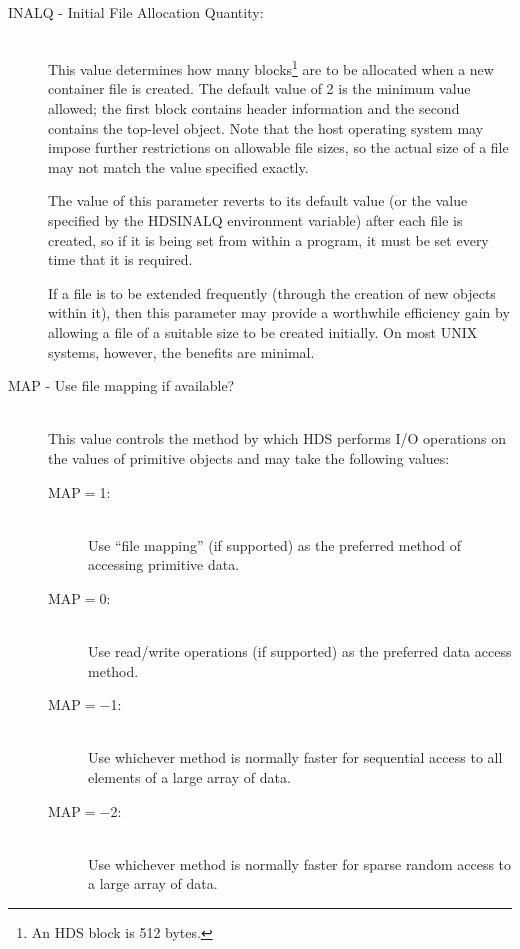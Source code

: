 \documentclass[twoside,11pt]{article}
\newcommand{\xlabel}[1]{}
\renewcommand{\_}{\texttt{\symbol{95}}}
\newcommand{\qt}[1]{``#1''}
\newcommand{\qt}[1]{{\tt{"}}#1{\tt{"}}}
\begin{document}
\begin{description}

\item [\xlabel{HDS_INALQ_tuning_parameter}INALQ - Initial File Allocation Quantity:]\mbox{}\\
This value determines how many blocks\footnote{An HDS block is 512
bytes.} are to be allocated when a new container file is created. The
default value of 2 is the minimum value allowed; the first block
contains header information and the second contains the top-level
object. Note that the host operating system may impose further
restrictions on allowable file sizes, so the actual size of a file may
not match the value specified exactly.

The value of this parameter reverts to its default value (or the value
specified by the HDS\_INALQ environment variable) after each file is
created, so if it is being set from within a program, it must be set
every time that it is required.

If a file is to be extended frequently (through the creation of new
objects within it), then this parameter may provide a worthwhile
efficiency gain by allowing a file of a suitable size to be created
initially. On most UNIX systems, however, the benefits are minimal.

\item [\xlabel{HDS_MAP_tuning_parameter}MAP - Use file mapping if available?]\mbox{}\\
This value controls the method by which HDS performs I/O operations on
the values of primitive objects and may take the following values:

\begin{description}

\item[MAP$=$1:]\mbox{}\\
Use \qt{file mapping} (if supported) as the preferred method of
accessing primitive data.

\item[MAP$=$0:]\mbox{}\\
Use read/write operations (if supported) as the preferred data access
method.

\item[MAP$=-$1:]\mbox{}\\
Use whichever method is normally faster for sequential access to all
elements of a large array of data.

\item[MAP$=-$2:]\mbox{}\\
Use whichever method is normally faster for sparse random access to a
large array of data.


\end{description}
\end{description}
\end{document}
